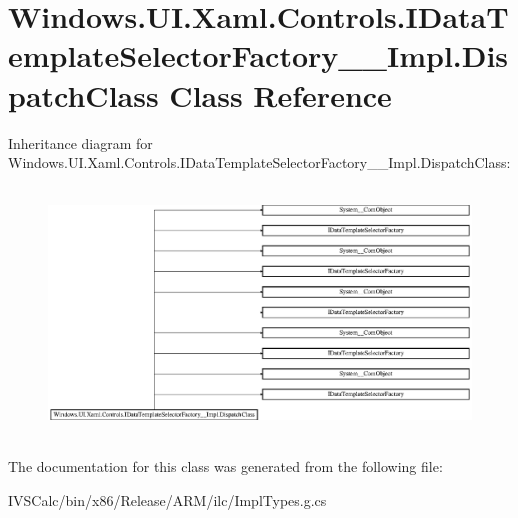 \hypertarget{class_windows_1_1_u_i_1_1_xaml_1_1_controls_1_1_i_data_template_selector_factory_____impl_1_1_dispatch_class}{}\section{Windows.\+U\+I.\+Xaml.\+Controls.\+I\+Data\+Template\+Selector\+Factory\+\_\+\+\_\+\+Impl.\+Dispatch\+Class Class Reference}
\label{class_windows_1_1_u_i_1_1_xaml_1_1_controls_1_1_i_data_template_selector_factory_____impl_1_1_dispatch_class}
Inheritance diagram for Windows.\+U\+I.\+Xaml.\+Controls.\+I\+Data\+Template\+Selector\+Factory\+\_\+\+\_\+\+Impl.\+Dispatch\+Class\+:\begin{figure}[H]
\begin{center}
\leavevmode
\includegraphics[height=6.666667cm]{class_windows_1_1_u_i_1_1_xaml_1_1_controls_1_1_i_data_template_selector_factory_____impl_1_1_dispatch_class}
\end{center}
\end{figure}


The documentation for this class was generated from the following file\+:\begin{DoxyCompactItemize}
\item 
I\+V\+S\+Calc/bin/x86/\+Release/\+A\+R\+M/ilc/Impl\+Types.\+g.\+cs\end{DoxyCompactItemize}
